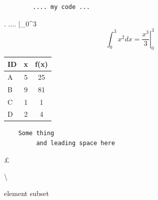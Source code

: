     \begin{lstlisting}
        .... my code ...
    \end{lstlisting}

    

    \left .   ....   \right|_0^3
    $$ \int_0^3 x^2 dx = \left.\frac{x^3}{3} \right|_0^3 $$


    \small
    \normalsize

    \setlength{\tabcolsep}{12pt}
    {\renewcommand{\arraystretch}{1.2}
    \begin{center}
    \begin{tabular}{l|c|c}
        ID & x & f(x)\\
        \hline
        A  & 5  & 25\\
        B  & 9  & 81\\
        C  & 1  & 1\\
        D  & 2  & 4
    \end{tabular}
    \end{center}

    \approx

    \begin{verbatim}
    Some thing
         and leading space here
    \end{verbatim}

    \ll \gg

    \pounds

    \setminus
    \textbackslash

    element \in
    subset \subseteq

    \addtolength{\jot}{0.5em}

    \       %
    \quad 	%
    \, 	    %
    \: 	    %
    \; 	    %
    \! 	    %
    \qquad 	%

    \usepackage{url}
    \usepackage{hyperref}

    \usepackage{float}
    \begin{figure}[H]


\end{figure}}
